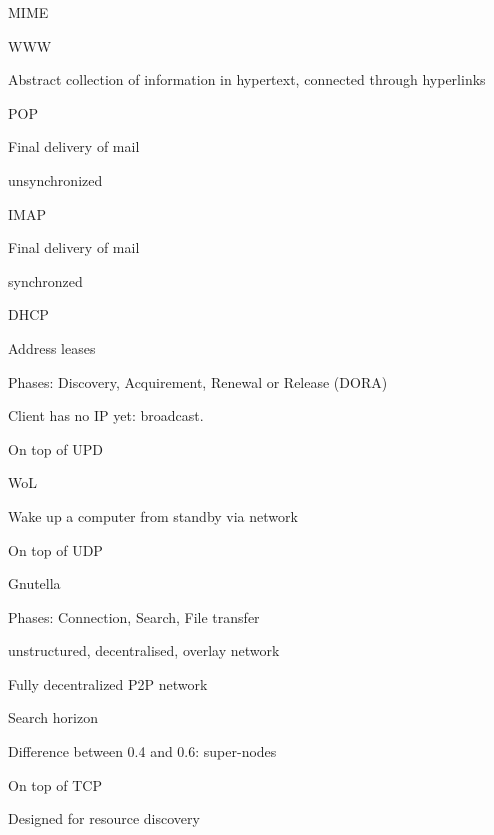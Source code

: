 \documentclass[main.tex]{subfiles}
\begin{document}
\begin{card}{MIME}
\TODO
\end{card}


\begin{card}{WWW}
\item Abstract collection of information in hypertext, connected through hyperlinks
\end{card}


\begin{card}{POP}
\item Final delivery of mail
\item unsynchronized
\end{card}


\begin{card}{IMAP}
\item Final delivery of mail
\item synchronzed
\end{card}


\begin{card}{DHCP}
\item Address leases
\item Phases: Discovery, Acquirement, Renewal or Release (DORA)
\item Client has no IP yet: broadcast.
\item On top of UPD
\end{card}


\begin{card}{WoL}
\item Wake up a computer from standby via network
\item On top of UDP
\end{card}




\begin{card}{Gnutella}
\item Phases: Connection, Search, File transfer
\item unstructured, decentralised, overlay network
\item Fully decentralized P2P network
\item Search horizon
\item Difference between 0.4 and 0.6: super-nodes
\item On top of TCP
\item Designed for resource discovery
\end{card}
\end{document}

